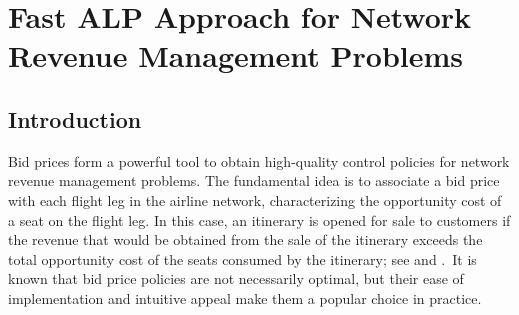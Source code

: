 \def \citeasnoun{\cite}
\def \ts {{\,}}
\def \Gdot {{\dot G}}
\def \Ebb {{\mathbb E}}
\def \Pbb {{\mathbb P}}
\def \Rbb {{\mathbb R}}
\def \Jcal{{\cal J}}
\def \Lcal{{\cal L}}
\def \Ncal{{\cal N}}
\def \Tcal{{\cal T}}
\def \Ucal{{\cal U}}
\def \Xcal{{\cal X}}
\def \thetatilde{{\tilde \theta}}
\def \utilde{{\tilde u}}
\def \vtilde{{\tilde v}}
\def \xtilde{{\tilde x}}
\def \Vtilde{{\tilde V}}
\def \varthetahat{{\hat \vartheta}}
\def \qed{\hfill $\Box$}

\chapter{Fast ALP Approach for Network Revenue Management Problems}

\section{Introduction}

\noindent Bid prices form a powerful tool to obtain high-quality control policies for network revenue management problems. The fundamental idea is to associate a bid price with each flight leg in the airline network, characterizing the opportunity cost of a seat on the flight leg. In this case, an itinerary is opened for sale to customers if the revenue that would be obtained from the sale of the itinerary exceeds the total opportunity cost of the seats consumed by the itinerary; see \citeasnoun{Wi92} and \citeasnoun{TaRy98}.~It is known that bid price policies are not necessarily optimal, but their ease of implementation and intuitive appeal make them a popular choice in practice.


